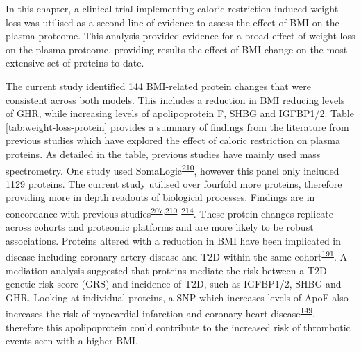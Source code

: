 \documentclass[11pt,twoside]{bristolthesis}
\begin{document}
In this chapter, a clinical trial implementing caloric restriction-induced weight loss was utilised as a second line of evidence to assess the effect of BMI on the plasma proteome. This analysis provided evidence for a broad effect of weight loss on the plasma proteome, providing results the effect of BMI change on the most extensive set of proteins to date.

The current study identified 144 BMI-related protein changes that were consistent across both models. This includes a reduction in BMI reducing levels of GHR, while increasing levels of apolipoprotein F, SHBG and IGFBP1/2. Table \ref{tab:weight-loss-protein} provides a summary of findings from the literature from previous studies which have explored the effect of caloric restriction on plasma proteins. As detailed in the table, previous studies have mainly used mass spectrometry. One study used SomaLogic\textsuperscript{\protect\hyperlink{ref-Carayol2017}{210}}, however this panel only included 1129 proteins. The current study utilised over fourfold more proteins, therefore providing more in depth readouts of biological processes. Findings are in concordance with previous studies\textsuperscript{\protect\hyperlink{ref-Figarska2020}{207},\protect\hyperlink{ref-Carayol2017}{210}--\protect\hyperlink{ref-Bruderer2019}{214}}. These protein changes replicate across cohorts and proteomic platforms and are more likely to be robust associations. Proteins altered with a reduction in BMI have been implicated in disease including coronary artery disease and T2D within the same cohort\textsuperscript{\protect\hyperlink{ref-Ritchie2019}{191}}. A mediation analysis suggested that proteins mediate the risk between a T2D genetic risk score (GRS) and incidence of T2D, such as IGFBP1/2, SHBG and GHR. Looking at individual proteins, a SNP which increases levels of ApoF also increases the risk of myocardial infarction and coronary heart disease\textsuperscript{\protect\hyperlink{ref-Liu2021}{149}}, therefore this apolipoprotein could contribute to the increased risk of thrombotic events seen with a higher BMI.
\end{document}

